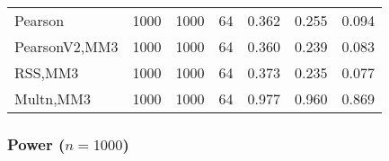 \documentclass[
]{article}
\begin{document}
\begin{table}[H]
{\begin{tabular}[t]{lrrrrrr}
\hspace{1em}Pearson & 1000 & 1000 & 64 & 0.362 & 0.255 & 0.094\\
\hspace{1em}PearsonV2,MM3 & 1000 & 1000 & 64 & 0.360 & 0.239 & 0.083\\
\hspace{1em}RSS,MM3 & 1000 & 1000 & 64 & 0.373 & 0.235 & 0.077\\
\hspace{1em}Multn,MM3 & 1000 & 1000 & 64 & 0.977 & 0.960 & 0.869\\
\bottomrule
\end{tabular}}
\end{table}

\hypertarget{power-n1000-1}{%
\subsubsection{\texorpdfstring{Power
(\(n=1000\))}{Power (n=1000)}}\label{power-n1000-1}}
\end{document}
